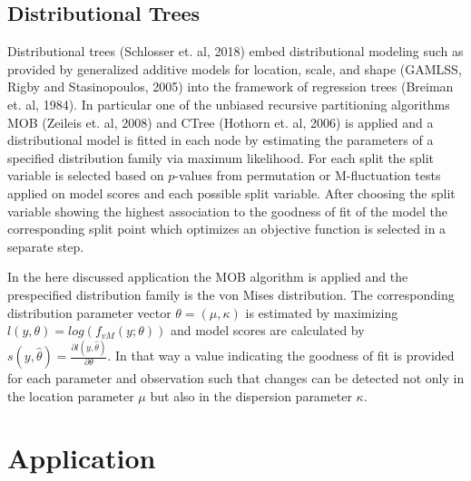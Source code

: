 \documentclass[twoside]{report}
\begin{document}
\subsection{Distributional Trees}
Distributional trees (Schlosser et. al, 2018) embed distributional modeling such as
provided by generalized additive models for location, scale, and shape 
(GAMLSS, Rigby and Stasinopoulos, 2005) into the framework of regression trees (Breiman et. al, 1984).
In particular one of the unbiased recursive partitioning algorithms MOB (Zeileis et. al, 2008) 
and CTree (Hothorn et. al, 2006) is applied and a distributional model is fitted in each node 
by estimating the parameters of a specified distribution family via maximum likelihood.
For each split the split variable is selected based on $p$-values from permutation or M-fluctuation 
tests applied on model scores and each possible split variable. After choosing the split variable 
showing the highest association to the goodness of fit of the model the corresponding split point 
which optimizes an objective function is selected in a separate step.

In the here discussed application the MOB algorithm is applied and the prespecified 
distribution family is the von Mises distribution. 
The corresponding distribution parameter vector $\theta = (\mu,\kappa)$ is estimated 
by maximizing $l(y, \theta) = log(f_{vM}(y;\theta))$ and model scores are calculated 
by $s(y,\hat{\theta}) = \frac{\partial l(y, \hat{\theta})}{\partial \theta}$. In that way
a value indicating the goodness of fit is provided for each parameter and observation
such that changes can be detected not only in the location parameter $\mu$ but also in the 
dispersion parameter $\kappa$.





\section{Application}
\end{document}
